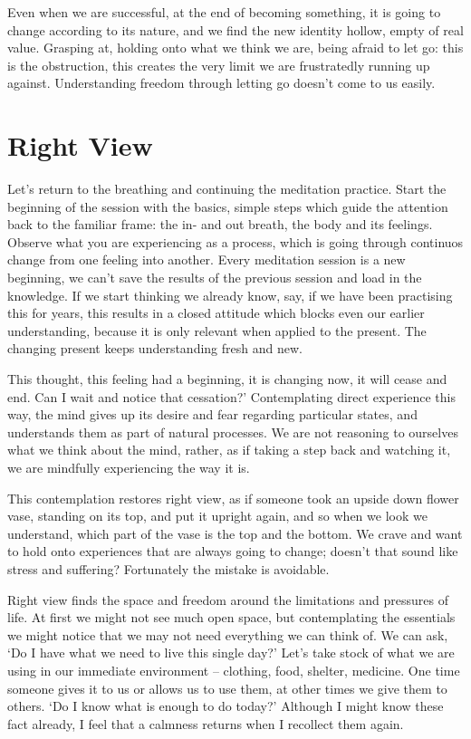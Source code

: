 Even when we are successful, at the end of becoming something, it is
going to change according to its nature, and we find the new identity
hollow, empty of real value. Grasping at, holding onto what we think we
are, being afraid to let go: this is the obstruction, this creates the
very limit we are frustratedly running up against. Understanding freedom
through letting go doesn't come to us easily.

\section{Right View}


Let's return to the breathing and continuing the meditation practice.
Start the beginning of the session with the basics, simple steps which
guide the attention back to the familiar frame: the in- and out breath,
the body and its feelings. Observe what you are experiencing as a
process, which is going through continuos change from one feeling into
another. Every meditation session is a new beginning, we can't save the
results of the previous session and load in the knowledge. If we start
thinking we already know, say, if we have been practising this for
years, this results in a closed attitude which blocks even our earlier
understanding, because it is only relevant when applied to the present.
The changing present keeps understanding fresh and new.

This thought, this feeling had a beginning, it is changing now, it will
cease and end. Can I wait and notice that cessation?' Contemplating
direct experience this way, the mind gives up its desire and fear
regarding particular states, and understands them as part of natural
processes. We are not reasoning to ourselves what we think about the
mind, rather, as if taking a step back and watching it, we are mindfully
experiencing the way it is.

This contemplation restores right view, as if someone took an upside
down flower vase, standing on its top, and put it upright again, and so
when we look we understand, which part of the vase is the top and the
bottom. We crave and want to hold onto experiences that are always going
to change; doesn't that sound like stress and suffering? Fortunately the
mistake is avoidable.


Right view finds the space and freedom around the limitations and
pressures of life. At first we might not see much open space, but
contemplating the essentials we might notice that we may not need
everything we can think of. We can ask, `Do I have what we need to live
this single day?' Let's take stock of what we are using in our immediate
environment -- clothing, food, shelter, medicine. One time someone gives
it to us or allows us to use them, at other times we give them to
others. `Do I know what is enough to do today?' Although I might know
these fact already, I feel that a calmness returns when I recollect them
again.

